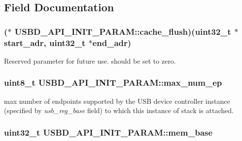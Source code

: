 \subsection{Field Documentation}
\hypertarget{structUSBD__API__INIT__PARAM_afb3e4b3d909cb45f0b6365e0ac8939b3}{
\subsubsection[{cache\-\_\-flush}]{($\ast$  U\-S\-B\-D\-\_\-\-A\-P\-I\-\_\-\-I\-N\-I\-T\-\_\-\-P\-A\-R\-A\-M\-::cache\-\_\-flush)(uint32\-\_\-t $\ast$start\-\_\-adr, uint32\-\_\-t $\ast$end\-\_\-adr)}}\label{structUSBD__API__INIT__PARAM_afb3e4b3d909cb45f0b6365e0ac8939b3}
Reserved parameter for future use. should be set to zero. \hypertarget{structUSBD__API__INIT__PARAM_a168996cbd91b47939fe823bf0bf7cbe0}{
\subsubsection[{max\-\_\-num\-\_\-ep}]{\setlength{\rightskip}{0pt plus 5cm}uint8\-\_\-t U\-S\-B\-D\-\_\-\-A\-P\-I\-\_\-\-I\-N\-I\-T\-\_\-\-P\-A\-R\-A\-M\-::max\-\_\-num\-\_\-ep}}\label{structUSBD__API__INIT__PARAM_a168996cbd91b47939fe823bf0bf7cbe0}
max number of endpoints supported by the U\-S\-B device controller instance (specified by {\itshape usb\-\_\-reg\-\_\-base} field) to which this instance of stack is attached. \hypertarget{structUSBD__API__INIT__PARAM_ac3209246722c2395c476c82d0e76c879}{
\subsubsection[{mem\-\_\-base}]{\setlength{\rightskip}{0pt plus 5cm}uint32\-\_\-t U\-S\-B\-D\-\_\-\-A\-P\-I\-\_\-\-I\-N\-I\-T\-\_\-\-P\-A\-R\-A\-M\-::mem\-\_\-base}}\label{structUSBD__API__INIT__PARAM_ac3209246722c2395c476c82d0e76c879}
